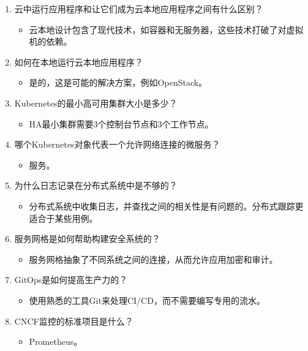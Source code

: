 \begin{enumerate}
\item
云中运行应用程序和让它们成为云本地应用程序之间有什么区别？
\begin{itemize}
\item 
云本地设计包含了现代技术，如容器和无服务器，这些技术打破了对虚拟机的依赖。
\end{itemize}

\item
如何在本地运行云本地应用程序？
\begin{itemize}
\item 
是的，这是可能的解决方案，例如OpenStack。
\end{itemize}

\item
Kubernetes的最小高可用集群大小是多少？
\begin{itemize}
\item 
HA最小集群需要3个控制台节点和3个工作节点。
\end{itemize}

\item
哪个Kubernetes对象代表一个允许网络连接的微服务？
\begin{itemize}
\item 
服务。
\end{itemize}

\item
为什么日志记录在分布式系统中是不够的？
\begin{itemize}
\item 
分布式系统中收集日志，并查找之间的相关性是有问题的。分布式跟踪更适合于某些用例。
\end{itemize}

\item
服务网格是如何帮助构建安全系统的？
\begin{itemize}
\item 
服务网格抽象了不同系统之间的连接，从而允许应用加密和审计。
\end{itemize}

\item
GitOps是如何提高生产力的？
\begin{itemize}
\item 
使用熟悉的工具Git来处理CI/CD，而不需要编写专用的流水。
\end{itemize}

\item
CNCF监控的标准项目是什么？
\begin{itemize}
\item 
Prometheus。
\end{itemize}
\end{enumerate}